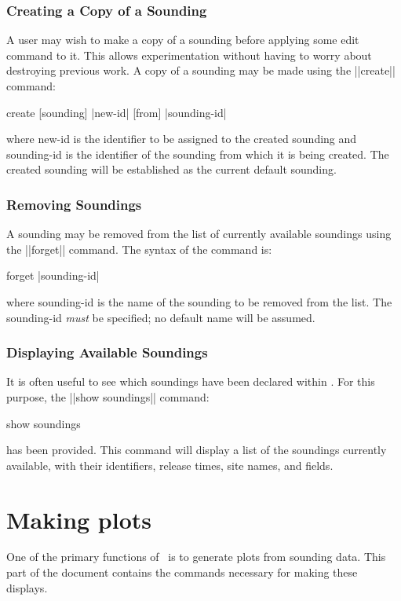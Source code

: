 \section {Creating a Copy of a Sounding}
A user may wish to make a copy of a sounding before applying some
edit command to it.  This allows experimentation without having to worry
about destroying previous work.
A copy of a sounding may be made using the ||create|| command:
\begin{example}
	create [sounding] |new-id| [from] |sounding-id|
\end{example}
where {\pf new-id} is the identifier to be assigned to the created sounding
and {\pf sounding-id} is the identifier of the sounding from which it is being
created.
The created sounding will be 
established as the current default sounding.


\section{Removing Soundings}
A sounding may be removed from the list of currently available soundings
using the ||forget|| command.  The syntax of the command is:
\begin{example}
	forget |sounding-id|
\end{example}
where {\pf sounding-id} is the name of the sounding to be removed from the 
list.  The {\pf sounding-id} {\it must} be specified; no default name will
be assumed.

\section{Displaying Available Soundings}

It is often useful to see which soundings have been declared within \suds.
For this purpose, the ||show soundings|| command:
\begin{example}
	show soundings
\end{example}
has been provided.  This command will display a list of the soundings 
currently available, with their identifiers, release times, site names, and
fields.


\part{Making plots}
\label{part-plot}
One of the primary functions of \suds\ is to generate plots from sounding
data.  This part of the document contains the commands necessary for
making these displays.


